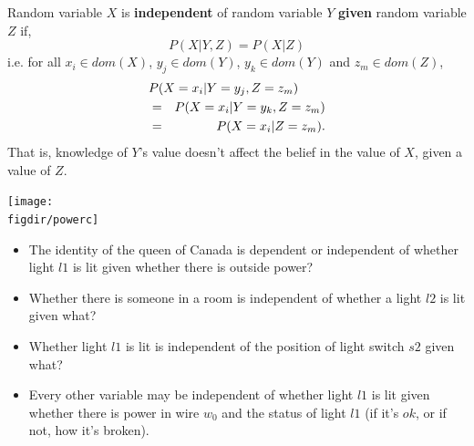 \documentclass[12pt]{beamer} %
\newcommand{\figdir}{../../figures/ch06}
\begin{document}





\begin{slide}
Random variable $X$ is \textbf{independent} of random variable $Y$
\textbf{given}
random variable $Z$ if,
\[P(X|Y,Z) = P(X|Z)\]
\pause i.e. for all $x_i\in dom(X)$, $y_j\in dom(Y)$, $y_k\in dom(Y)$ and $z_m\in dom(Z)$,
\begin{eqnarray*}
\lefteqn{P(X=x_i|Y=y_j, Z=z_m)}\\
&=&P(X=x_i|Y=y_k, Z=z_m)\\
&=& P(X=x_i|Z=z_m).
\end{eqnarray*}
That is, knowledge of $Y$'s value doesn't affect the belief in
the value of $X$, given a value of $Z$.

\end{slide}
\begin{slide}
\begin{center}
\texttt{[image: \\figdir/powerc]}
\end{center}
\end{slide}
\begin{slide}
\begin{itemize}
\item The identity of the queen of Canada is dependent or independent of whether
light $l1$ is lit given whether there is outside power?
\item Whether there is someone in a room is independent of whether a
light $l2$ is lit given what? %
\item Whether 
light $l1$ is lit is independent of the position of light switch $s2$
given what?%
\item Every other variable may be independent of whether 
light $l1$ is lit given \pause
whether there is power in wire $w_0$ and 
the status of light $l1$ (if it's $ok$, or if not, how it's broken).
\end{itemize}

\end{slide}
\end{document}
